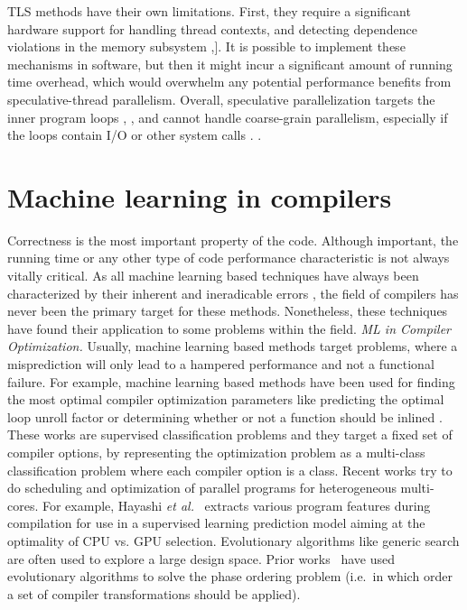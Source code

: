 \quad TLS methods have their own limitations. First, they require a significant hardware support for handling thread contexts, and detecting dependence violations in the memory subsystem \cite{10.1145/1122971.1122997},\cite{10.5555/822079.822712}]. It is possible to implement these mechanisms in software, but then it might incur a significant amount of running time overhead, which would overwhelm any potential performance benefits from speculative-thread parallelism. Overall, speculative parallelization targets the inner program loops \cite{4147670}, \cite{10.1145/1150019.1136512}, \cite{10.1145/1122971.1122997} and cannot handle coarse-grain parallelism, especially if the loops contain I/O or other system calls \cite{10.1016/j.parco.2010.05.006}.\newline\null
.
\section{Machine learning in compilers}
\label{related_work_ml}
\quad Correctness is the most important property of the code. Although important, the running time or any other type of code performance characteristic is not always vitally critical. As all machine learning based techniques have always been characterized by their inherent and ineradicable errors \cite{James:2013:ISL:2517747}, the field of compilers has never been the primary target for these methods. Nonetheless, these techniques have found their application to some problems within the field.\newline\null
\textit{ML in Compiler Optimization.}
Usually, machine learning based methods target problems, where a misprediction will only lead to a hampered performance and not a functional failure. For example, machine learning based methods have been used for finding the most optimal compiler optimization parameters like predicting the optimal loop unroll factor \cite{4907653,1402082} or determining whether or not a function should be inlined \cite{Zhao2003ToIO,1559966}. These works are supervised classification problems and they target a fixed set of compiler options, by representing the optimization problem as a multi-class classification problem where each compiler option is a class. Recent works try to do scheduling and optimization of parallel programs for heterogeneous multi-cores. For example, Hayashi \emph{et al.}~\cite{Hayashi:2015:MPH:2807426.2807429} extracts various program features during compilation for use in a supervised learning prediction model aiming at the optimality of CPU vs. GPU selection. Evolutionary algorithms like generic search are often used to explore a large design space. Prior works~\cite{Almagor:2004:FEC:997163.997196,Cooper:2005:AAC:1065910.1065921,Ashouri:2017:MMC:3132652.3124452} have used evolutionary algorithms to solve the phase ordering problem (i.e.\ in which order a set of compiler transformations should be applied).\newline\null
